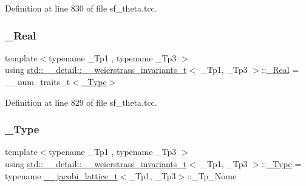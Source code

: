 Definition at line 830 of file sf\+\_\+theta.\+tcc.

\mbox{\label{structstd_1_1____detail_1_1____weierstrass__invariants__t_a7990bba8f3b3d155a80d051c86de1460}} 
\subsubsection{\texorpdfstring{\+\_\+\+Real}{\_Real}}
{\footnotesize\ttfamily template$<$typename \+\_\+\+Tp1 , typename \+\_\+\+Tp3 $>$ \\
using \hyperlink{structstd_1_1____detail_1_1____weierstrass__invariants__t}{std\+::\+\_\+\+\_\+detail\+::\+\_\+\+\_\+weierstrass\+\_\+invariants\+\_\+t}$<$ \+\_\+\+Tp1, \+\_\+\+Tp3 $>$\+::\hyperlink{structstd_1_1____detail_1_1____weierstrass__invariants__t_a7990bba8f3b3d155a80d051c86de1460}{\+\_\+\+Real} =  \+\_\+\+\_\+num\+\_\+traits\+\_\+t$<$\hyperlink{structstd_1_1____detail_1_1____weierstrass__invariants__t_a9992ab3f07a514203487c0760d76173f}{\+\_\+\+Type}$>$}



Definition at line 829 of file sf\+\_\+theta.\+tcc.

\mbox{\label{structstd_1_1____detail_1_1____weierstrass__invariants__t_a9992ab3f07a514203487c0760d76173f}} 
\subsubsection{\texorpdfstring{\+\_\+\+Type}{\_Type}}
{\footnotesize\ttfamily template$<$typename \+\_\+\+Tp1 , typename \+\_\+\+Tp3 $>$ \\
using \hyperlink{structstd_1_1____detail_1_1____weierstrass__invariants__t}{std\+::\+\_\+\+\_\+detail\+::\+\_\+\+\_\+weierstrass\+\_\+invariants\+\_\+t}$<$ \+\_\+\+Tp1, \+\_\+\+Tp3 $>$\+::\hyperlink{structstd_1_1____detail_1_1____weierstrass__invariants__t_a9992ab3f07a514203487c0760d76173f}{\+\_\+\+Type} =  typename \hyperlink{structstd_1_1____detail_1_1____jacobi__lattice__t}{\+\_\+\+\_\+jacobi\+\_\+lattice\+\_\+t}$<$\+\_\+\+Tp1, \+\_\+\+Tp3$>$\+::\+\_\+\+Tp\+\_\+\+Nome}



